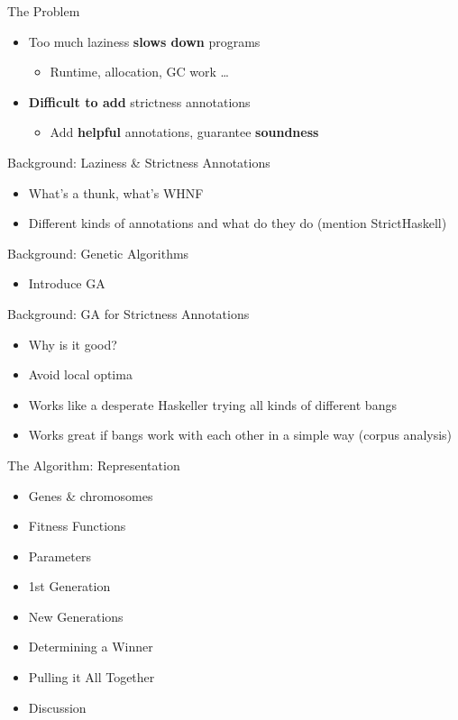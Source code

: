 \documentclass{beamer}
\begin{document}
\begin{frame}{The Problem}
\begin{itemize}
\item Too much laziness \textbf{slows down} programs
  \begin{itemize}
    \item Runtime, allocation, GC work \dots
  \end{itemize}
\item \textbf{Difficult to add} strictness annotations
  \begin{itemize}
    \item Add \textbf{helpful} annotations, guarantee \textbf{soundness}
  \end{itemize}
\end{itemize}
\end{frame}

\begin{frame}{Background: Laziness \& Strictness Annotations}
  \begin{itemize}
    \item What's a thunk, what's WHNF
    \item Different kinds of annotations and what do they do (mention StrictHaskell)
  \end{itemize}
\end{frame}

\begin{frame}{Background: Genetic Algorithms}
  \begin{itemize}
    \item Introduce GA
  \end{itemize}
\end{frame}

\begin{frame}{Background: GA for Strictness Annotations}
  \begin{itemize}
    \item Why is it good?
    \item Avoid local optima
    \item Works like a desperate Haskeller trying all kinds of different bangs
    \item Works great if bangs work with each other in a simple way (corpus analysis)
  \end{itemize}
\end{frame}

\begin{frame}{The Algorithm: Representation}
  \begin{itemize}
  \item Genes \& chromosomes
  \item Fitness Functions
  \item Parameters
  \item 1st Generation
  \item New Generations
  \item Determining a Winner
  \item Pulling it All Together
  \item Discussion
  \end{itemize}
\end{frame}
\end{document}

